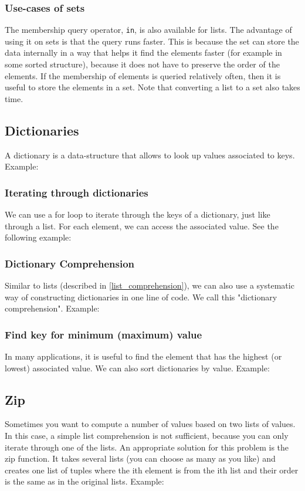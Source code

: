 \documentclass[10pt,a4paper]{article}
\begin{document}
\subsubsection{Use-cases of sets}
The membership query operator, \texttt{in}, is also available for lists. The advantage of using it on sets is that the query runs faster. This is because the set can store the data internally in a way that helps it find the elements faster (for example in some sorted structure), because it does not have to preserve the order of the elements. If the membership of elements is queried relatively often, then it is useful to store the elements in a set. Note that converting a list to a set also takes time.

\subsection{Dictionaries}
A dictionary is a data-structure that allows to look up values associated to keys. Example:

\subsubsection{Iterating through dictionaries}
We can use a for loop to iterate through the keys of a dictionary, just like through a list. For each element, we can access the associated value. See the following example:

\subsubsection{Dictionary Comprehension}
Similar to lists (described in \ref{list_comprehension}), we can also use a systematic way of constructing dictionaries in one line of code. We call this "dictionary comprehension". Example:

\subsubsection{Find key for minimum (maximum) value}
In many applications, it is useful to find the element that has the highest (or lowest) associated value. We can also sort dictionaries by value. Example:



\subsection{Zip}
Sometimes you want to compute a number of values based on two lists of values. In this case, a simple list comprehension is not sufficient, because you can only iterate through one of the lists. An appropriate solution for this problem is the zip function. It takes several lists (you can choose as many as you like) and creates one list of tuples where the ith element is from the ith list and their order is the same as in the original lists. Example:

\end{document}
